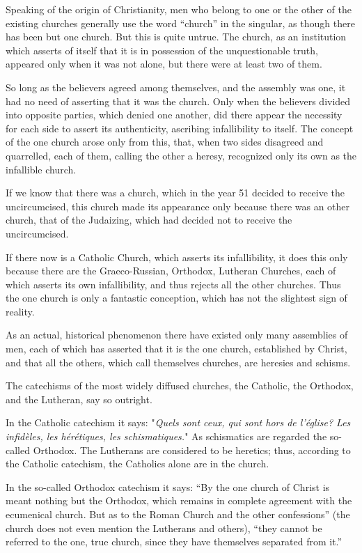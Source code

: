\documentclass{book}
\begin{document}
Speaking of the origin of Christianity, men who belong to one or the other of the existing churches generally use the word “church” in the singular, as though there has been but one church. But this is quite untrue. The church, as an institution which asserts of itself that it is in possession of the unquestionable truth, appeared only when it was not alone, but there were at least two of them.

So long as the believers agreed among themselves, and the assembly was one, it had no need of asserting that it was the church. Only when the believers divided into opposite parties, which denied one another, did there appear the necessity for each side to assert its authenticity, ascribing infallibility to itself. The concept of the one church arose only from this, that, when two sides disagreed and quarrelled, each of them, calling the other a heresy, recognized only its own as the infallible church.

If we know that there was a church, which in the year 51 decided to receive the uncircumcised, this church made its appearance only because there was an other church, that of the Judaizing, which had decided not to receive the uncircumcised.

If there now is a Catholic Church, which asserts its infallibility, it does this only because there are the Graeco-Russian, Orthodox, Lutheran Churches, each of which asserts its own infallibility, and thus rejects all the other churches. Thus the one church is only a fantastic conception, which has not the slightest sign of reality.

As an actual, historical phenomenon there have existed only many assemblies of men, each of which has asserted that it is the one church, established by Christ, and that all the others, which call themselves churches, are heresies and schisms.

The catechisms of the most widely diffused churches, the Catholic, the Orthodox, and the Lutheran, say so outright.

In the Catholic catechism it says: "\emph{Quels sont ceux, qui sont hors de l’église? Les infidèles, les hérétiques, les schismatiques.}" As schismatics are regarded the so-called Orthodox. The Lutherans are considered to be heretics; thus, according to the Catholic catechism, the Catholics alone are in the church.

In the so-called Orthodox catechism it says: “By the one church of Christ is meant nothing but the Orthodox, which remains in complete agreement with the ecumenical church. But as to the Roman Church and the other confessions” (the church does not even mention the Lutherans and others), “they cannot be referred to the one, true church, since they have themselves separated from it.”
\end{document}
